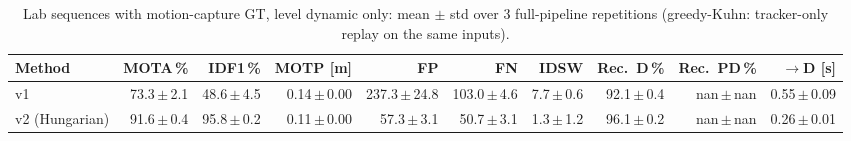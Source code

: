 \begin{table}[t]
\centering
\caption{Lab sequences with motion-capture GT, level dynamic only: mean $\pm$ std over 3 full-pipeline repetitions (greedy-Kuhn: tracker-only replay on the same inputs).}
\label{tab:own_r9_dynamic_only_reps}
\setlength{\tabcolsep}{3pt}
\begin{tabular}{lrrrrrrrrr}
\toprule
Method & MOTA\,\% & IDF1\,\% & MOTP [m] & FP & FN & IDSW & Rec.\ D\,\% & Rec.\ PD\,\% & $\to$D [s] \\
\midrule
v1 & 73.3\,$\pm$\,2.1 & 48.6\,$\pm$\,4.5 & 0.14\,$\pm$\,0.00 & 237.3\,$\pm$\,24.8 & 103.0\,$\pm$\,4.6 & 7.7\,$\pm$\,0.6 & 92.1\,$\pm$\,0.4 & nan\,$\pm$\,nan & 0.55\,$\pm$\,0.09 \\
v2 (Hungarian) & 91.6\,$\pm$\,0.4 & 95.8\,$\pm$\,0.2 & 0.11\,$\pm$\,0.00 & 57.3\,$\pm$\,3.1 & 50.7\,$\pm$\,3.1 & 1.3\,$\pm$\,1.2 & 96.1\,$\pm$\,0.2 & nan\,$\pm$\,nan & 0.26\,$\pm$\,0.01 \\
\bottomrule
\end{tabular}
\end{table}
